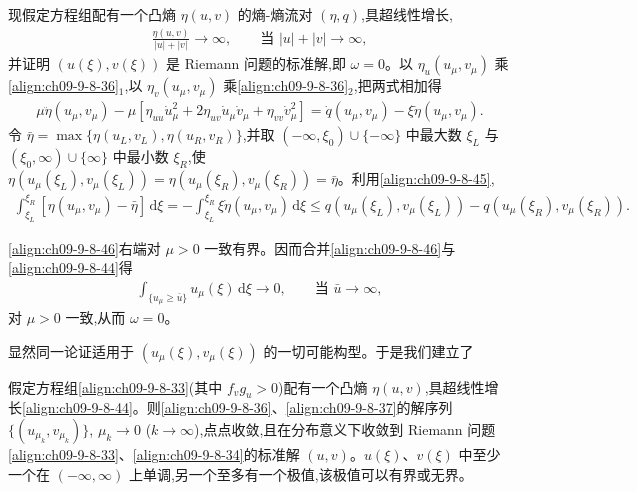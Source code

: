 \documentclass[../../main.tex]{subfiles}
\begin{document}
现假定方程组配有一个凸熵 $\eta(u,v)$ 的熵-熵流对 $(\eta,q)$,具超线性增长,
\begin{align}
\frac{\eta(u,v)}{|u|+|v|}\to\infty,\qquad\text{当 }|u|+|v|\to\infty,
\label{align:ch09-9-8-44}
\end{align}
并证明 $(u(\xi),v(\xi))$ 是 Riemann 问题的标准解,即 $\omega=0$。以 $\eta_{u}(u_{\mu},v_{\mu})$ 乘\eqref{align:ch09-9-8-36}$_{1}$,以 $\eta_{v}(u_{\mu},v_{\mu})$ 乘\eqref{align:ch09-9-8-36}$_{2}$,把两式相加得
\begin{align}
\mu\ddot{\eta}(u_{\mu},v_{\mu})-\mu[\eta_{uu}\dot{u}_{\mu}^{2}+2\eta_{uv}\dot{u}_{\mu}\dot{v}_{\mu}+\eta_{vv}\dot{v}_{\mu}^{2}]
=\dot{q}(u_{\mu},v_{\mu})-\xi\dot{\eta}(u_{\mu},v_{\mu}).
\label{align:ch09-9-8-45}
\end{align}
令 $\bar{\eta}=\max\{\eta(u_{L},v_{L}),\eta(u_{R},v_{R})\}$,并取 $(-\infty,\xi_{0})\cup\{-\infty\}$ 中最大数 $\xi_{L}$ 与 $(\xi_{0},\infty)\cup\{\infty\}$ 中最小数 $\xi_{R}$,使 $\eta(u_{\mu}(\xi_{L}),v_{\mu}(\xi_{L}))=\eta(u_{\mu}(\xi_{R}),v_{\mu}(\xi_{R}))=\bar{\eta}$。利用\eqref{align:ch09-9-8-45},
\begin{align}
\int_{\xi_{L}}^{\xi_{R}}[\eta(u_{\mu},v_{\mu})-\bar{\eta}]\,\mathrm{d}\xi
=-\int_{\xi_{L}}^{\xi_{R}}\xi\dot{\eta}(u_{\mu},v_{\mu})\,\mathrm{d}\xi
\leqslant q(u_{\mu}(\xi_{L}),v_{\mu}(\xi_{L}))-q(u_{\mu}(\xi_{R}),v_{\mu}(\xi_{R})).
\label{align:ch09-9-8-46}
\end{align}

\eqref{align:ch09-9-8-46}右端对 $\mu>0$ 一致有界。因而合并\eqref{align:ch09-9-8-46}与\eqref{align:ch09-9-8-44}得
\begin{align}
\int_{\{u_{\mu}\geqslant\bar{u}\}}u_{\mu}(\xi)\,\mathrm{d}\xi\to0,\qquad\text{当 }\bar{u}\to\infty,
\label{align:ch09-9-8-47}
\end{align}
对 $\mu>0$ 一致,从而 $\omega=0$。

显然同一论证适用于 $(u_{\mu}(\xi),v_{\mu}(\xi))$ 的一切可能构型。于是我们建立了

\begin{theorem}\label{theorem:ch09-两方程粘性极限}
假定方程组\eqref{align:ch09-9-8-33}(其中 $f_{v}g_{u}>0$)配有一个凸熵 $\eta(u,v)$,具超线性增长\eqref{align:ch09-9-8-44}。则\eqref{align:ch09-9-8-36}、\eqref{align:ch09-9-8-37}的解序列 $\{(u_{\mu_{k}},v_{\mu_{k}})\}$, $\mu_{k}\to0$ ($k\to\infty$),点点收敛,且在分布意义下收敛到 Riemann 问题\eqref{align:ch09-9-8-33}、\eqref{align:ch09-9-8-34}的标准解 $(u,v)$。$u(\xi)$、$v(\xi)$ 中至少一个在 $(-\infty,\infty)$ 上单调,另一个至多有一个极值,该极值可以有界或无界。
\end{theorem}
\end{document}
